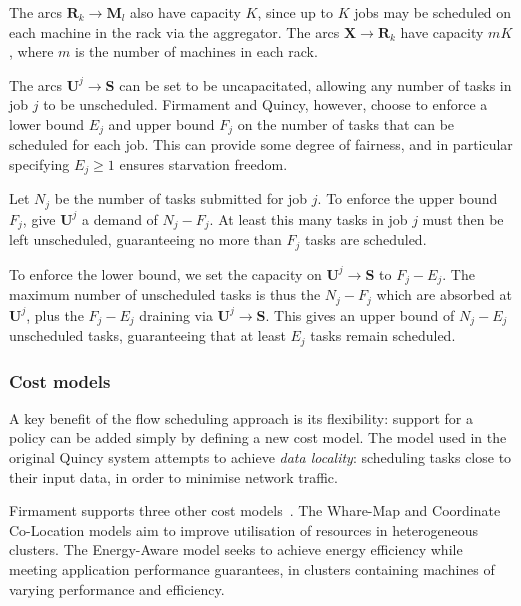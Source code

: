 The arcs $\mathbf{R}_k \to \mathbf{M}_l$ also have capacity $K$, since up to $K$ jobs may be scheduled on each machine in the rack via the aggregator. The arcs $\mathbf{X} \to \mathbf{R}_k$ have capacity $mK$, where $m$ is the number of machines in each rack\footnotemark.

The arcs $\mathbf{U}^j \to \mathbf{S}$ can be set to be uncapacitated, allowing any number of tasks in job $j$ to be unscheduled. Firmament and Quincy, however, choose to enforce a lower bound $E_j$ and upper bound $F_j$ on the number of tasks that can be scheduled for each job. This can provide some degree of fairness, and in particular specifying $E_j \geq 1$ ensures starvation freedom.

Let $N_j$ be the number of tasks submitted for job $j$. To enforce the upper bound $F_j$, give $\mathbf{U}^j$ a demand of $N_j - F_j$. At least this many tasks in job $j$ must then be left unscheduled, guaranteeing no more than $F_j$ tasks are scheduled.

To enforce the lower bound, we set the capacity on $\mathbf{U}^j \to \mathbf{S}$ to $F_j - E_j$. The maximum number of unscheduled tasks is thus the $N_j - F_j$ which are absorbed at $\mathbf{U}^j$, plus the $F_j - E_j$ draining via $\mathbf{U}^j \to \mathbf{S}$. This gives an upper bound of $N_j - E_j$ unscheduled tasks, guaranteeing that at least $E_j$ tasks remain scheduled.

\subsubsection{Cost models}  


A key benefit of the flow scheduling approach is its flexibility: support for a policy can be added simply by defining a new cost model. The model used in the original Quincy system attempts to achieve \emph{data locality}: scheduling tasks close to their input data, in order to minimise network traffic. 

Firmament supports three other cost models~\cite[ch.~5]{Schwarzkopf:2015}. The Whare-Map and Coordinate Co-Location models aim to improve utilisation of resources in heterogeneous clusters. The Energy-Aware model seeks to achieve energy efficiency while meeting application performance guarantees, in clusters containing machines of varying performance and efficiency.

